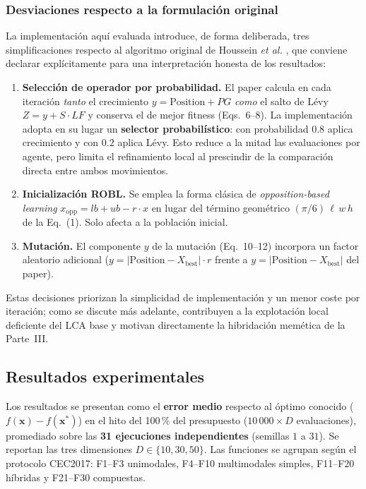 \subsubsection{Desviaciones respecto a la formulación original}

La implementación aquí evaluada introduce, de forma deliberada, tres simplificaciones
respecto al algoritmo original de Houssein \emph{et al.} \cite{houssein2023lca}, que conviene
declarar explícitamente para una interpretación honesta de los resultados:

\begin{enumerate}
  \item \textbf{Selección de operador por probabilidad.} El paper calcula en cada iteración
    \emph{tanto} el crecimiento $y = \text{Position}+PG$ \emph{como} el salto de Lévy
    $Z = y + S\cdot LF$ y conserva el de mejor fitness (Eqs.~6--8). La implementación adopta
    en su lugar un \textbf{selector probabilístico}: con probabilidad $0.8$ aplica crecimiento
    y con $0.2$ aplica Lévy. Esto reduce a la mitad las evaluaciones por agente, pero limita
    el refinamiento local al prescindir de la comparación directa entre ambos movimientos.
  \item \textbf{Inicialización ROBL.} Se emplea la forma clásica de \emph{opposition-based
    learning} $x_{\text{opp}} = lb + ub - r\cdot x$ en lugar del término geométrico
    $(\pi/6)\,\ell\,w\,h$ de la Eq.~(1). Solo afecta a la población inicial.
  \item \textbf{Mutación.} El componente $y$ de la mutación (Eq.~10--12) incorpora un factor
    aleatorio adicional ($y = |\text{Position}-X_{\text{best}}|\cdot r$ frente a
    $y = |\text{Position}-X_{\text{best}}|$ del paper).
\end{enumerate}

Estas decisiones priorizan la simplicidad de implementación y un menor coste por iteración;
como se discute más adelante, contribuyen a la explotación local deficiente del LCA base y
motivan directamente la hibridación memética de la Parte~III.

\subsection{Resultados experimentales}

Los resultados se presentan como el \textbf{error medio} respecto al óptimo conocido
($f(\mathbf{x}) - f(\mathbf{x}^*)$) en el hito del 100\,\% del presupuesto
($10\,000 \times D$ evaluaciones), promediado sobre las \textbf{31 ejecuciones
independientes} (semillas $1$ a $31$). Se reportan las tres dimensiones $D \in \{10, 30, 50\}$.
Las funciones se agrupan según el protocolo CEC2017: F1--F3 unimodales, F4--F10 multimodales
simples, F11--F20 híbridas y F21--F30 compuestas.

